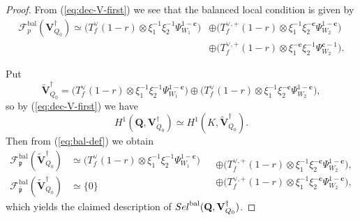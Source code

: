 \documentclass[10pt,letterpaper]{amsart}
\theoremstyle{plain}
\theoremstyle{definition}
\theoremstyle{definition}
\theoremstyle{plain}
\theoremstyle{plain}
\theoremstyle{plain}
\theoremstyle{remark}
\numberwithin{equation}{section}
\newcommand{\cc}{\mathbf{c}}
\newcommand{\ch}{\xi}
\newcommand{\Sel}{Sel}
\newcommand{\rH}{H}
\newcommand{\pp}{\mathfrak{p}}
\newcommand{\ppbar}{\bar{\mathfrak{p}}}
\DeclareMathOperator{\bal}{\mathrm{bal}}
\newcommand{\Vsdag}{{\mathbf{V}_{Q_0}^\dagger}}
\newcommand{\Q}{\mathbf{Q}}
\def\Sel{{\rm Sel}}
\begin{document}
\begin{proof}
From (\ref{eq:dec-V-first}) we see that the balanced local condition is given by
\begin{equation}\label{eq:bal-def}
\begin{aligned}
\mathscr{F}^{\bal}_p(\Vsdag)
\simeq\bigl(T_f^{\vee}(1-r)\otimes\ch_1^{-1}\ch_2^{-1}\Psi_{W_1}^{1-\cc}\bigr)&\oplus\bigl(T_f^{\vee,+}(1-r)\otimes\ch_1^{-1}\ch_2^{-\cc}\Psi_{W_2}^{1-\cc}\bigr)\\
&\oplus\bigl(T_f^{\vee,+}(1-r)\otimes\ch_1^{-\cc}\ch_2^{-1}\Psi_{W_2}^{\cc-1}\bigr).
\end{aligned}
\end{equation}






Put \[\widetilde{\mathbf{V}}_{Q_0}^\dagger=\bigl(T_f^{\vee}(1-r)\otimes\ch_1^{-1}\ch_2^{-1}\Psi_{W_1}^{1-\cc}\bigr)\oplus\bigl(T_f^{\vee}(1-r)\otimes\ch_1^{-1}\ch_2^{-\cc}\Psi_{W_2}^{1-\cc}\bigr),\]
so by (\ref{eq:dec-V-first}) we have
\begin{equation}\label{eq:shapiro-bis}
\rH^1(\Q,\mathbf{V}_{Q_0}^\dagger)\simeq\rH^1(K,\widetilde{\mathbf{V}}_{Q_0}^\dagger).
\end{equation}
Then from (\ref{eq:bal-def}) we obtain
\begin{equation}\label{eq:bal-shapiro}
\begin{split}
\mathscr{F}^{\bal}_\pp(\widetilde{\mathbf{V}}_{Q_0}^\dagger)&\simeq\bigl(T_f^{\vee}(1-r)\otimes\ch_1^{-1}\ch_2^{-1}\Psi_{W_1}^{1-\cc}\bigr)\\
\mathscr{F}^{\bal}_{\ppbar}(\widetilde{\mathbf{V}}_{Q_0}^\dagger)&\simeq\{0\}
\end{split}
\begin{split}
&\oplus\bigl(T_f^{\vee,+}(1-r)\otimes\ch_1^{-1}\ch_2^{-\cc}\Psi_{W_2}^{1-\cc}\bigr),\\
&\oplus \bigl( T_f^{\vee,+}(1-r)\otimes\ch_1^{-1}\ch_2^{-\cc}\Psi_{W_2}^{1-\cc}\bigr),\nonumber
\end{split}
\end{equation}
%
which yields the claimed description of $\Sel^{\bal}(\Q,\Vsdag)$. 


\end{proof}
\end{document}
